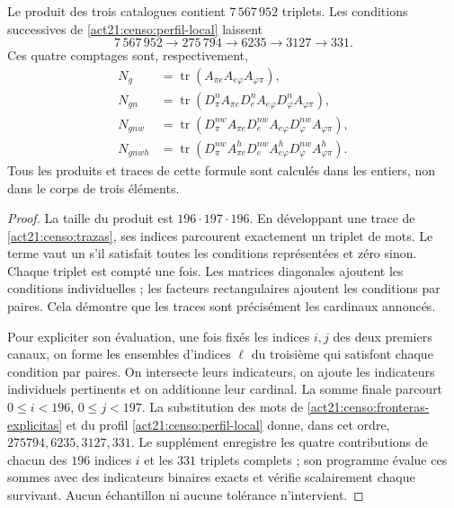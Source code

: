 \begin{theorem}
\label{act21:censo:teorema-conteo}
Le produit des trois catalogues contient \(7\,567\,952\) triplets.
Les conditions successives de \eqref{act21:censo:perfil-local} laissent
\begin{equation}
 7\,567\,952\longrightarrow275\,794\longrightarrow6235
 \longrightarrow3127\longrightarrow331.
 \label{act21:censo:cadena-local}
\end{equation}
Ces quatre comptages sont, respectivement,
\begin{align}
 N_g&=\operatorname{tr}(A_{\pi e}A_{e\varphi}A_{\varphi\pi}),
 \nonumber\\
 N_{gn}&=\operatorname{tr}(D_\pi^n A_{\pi e}
             D_e^n A_{e\varphi}D_\varphi^n A_{\varphi\pi}),
 \nonumber\\
 N_{gnw}&=\operatorname{tr}(D_\pi^{nw} A_{\pi e}
             D_e^{nw} A_{e\varphi}D_\varphi^{nw} A_{\varphi\pi}),
 \nonumber\\
 N_{gnwh}&=\operatorname{tr}(D_\pi^{nw} A^h_{\pi e}
             D_e^{nw} A^h_{e\varphi}D_\varphi^{nw} A^h_{\varphi\pi}).
 \label{act21:censo:trazas}
\end{align}
Tous les produits et traces de cette formule sont calculés dans les entiers,  
non dans le corps de trois éléments.
\end{theorem}
\begin{proof}
La taille du produit est \(196\cdot197\cdot196\). En développant
une trace de \eqref{act21:censo:trazas}, ses indices parcourent exactement un
triplet de mots. Le terme vaut un s'il satisfait toutes les conditions
représentées et zéro sinon. Chaque triplet est compté une fois.
Les matrices diagonales ajoutent les conditions individuelles ; les facteurs
rectangulaires ajoutent les conditions par paires. Cela démontre que les
traces sont précisément les cardinaux annoncés.

Pour expliciter son évaluation, une fois fixés les indices \(i,j\) des deux premiers canaux, on forme les ensembles d'indices \(\ell\) du troisième qui satisfont chaque condition par paires. On intersecte leurs indicateurs, on ajoute les indicateurs individuels pertinents et on additionne leur cardinal. La somme finale parcourt \(0\leq i<196\), \(0\leq j<197\). La substitution des mots de \eqref{act21:censo:fronteras-explicitas} et du profil \eqref{act21:censo:perfil-local} donne, dans cet ordre, \(275794,6235,3127,331\). Le supplément enregistre les quatre contributions de chacun des \(196\) indices \(i\) et les \(331\) triplets complets ; son programme évalue ces sommes avec des indicateurs binaires exacts et vérifie scalairement chaque survivant. Aucun échantillon ni aucune tolérance n'intervient.
\end{proof}

